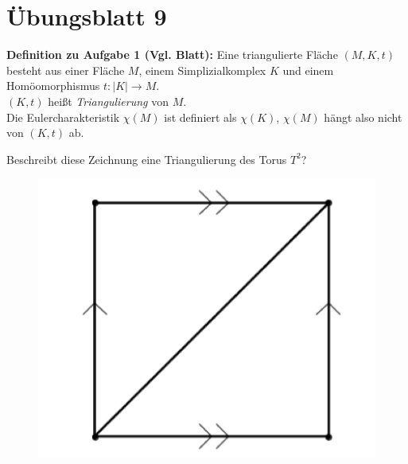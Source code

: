 %
\section{Übungsblatt 9}
\setcounter{problemcounter}{0}

\textbf{Definition zu Aufgabe 1 (Vgl. Blatt):} Eine triangulierte Fläche \( (M, K, t) \) besteht aus einer Fläche \( M \), einem Simplizialkomplex \( K \) und einem Homöomorphismus \( t: \vert K \vert \to M \). \\
\( (K, t) \) heißt \emph{Triangulierung} von \( M \). \\
Die Eulercharakteristik \( \chi(M) \) ist definiert als \( \chi(K) \), \( \chi(M) \) hängt also nicht von \( (K,t) \) ab.

\begin{assignment}
  Beschreibt diese Zeichnung eine Triangulierung des Torus \( T^2 \)?
  \begin{figure}[H]
    \centering
    \includegraphics[width=.3\textwidth]{assets/images/triangulation_torus.png}
  \end{figure}
\end{assignment}

